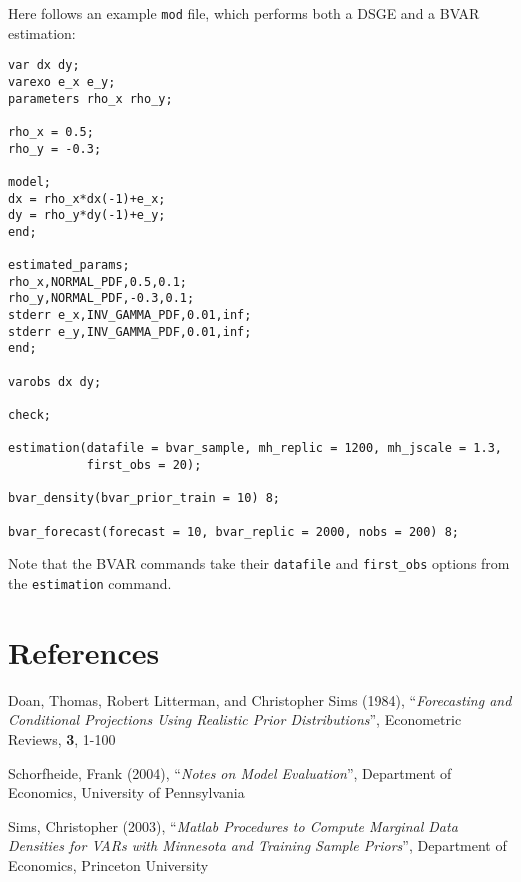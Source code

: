 \documentclass[11pt,a4paper]{article}
\begin{document}
Here follows an example \texttt{mod} file, which performs both a DSGE and a BVAR estimation:

\begin{verbatim}
var dx dy;
varexo e_x e_y;
parameters rho_x rho_y;

rho_x = 0.5;
rho_y = -0.3;

model;
dx = rho_x*dx(-1)+e_x;
dy = rho_y*dy(-1)+e_y;
end;

estimated_params;
rho_x,NORMAL_PDF,0.5,0.1;
rho_y,NORMAL_PDF,-0.3,0.1;
stderr e_x,INV_GAMMA_PDF,0.01,inf;
stderr e_y,INV_GAMMA_PDF,0.01,inf;
end;

varobs dx dy;

check;

estimation(datafile = bvar_sample, mh_replic = 1200, mh_jscale = 1.3,
           first_obs = 20);

bvar_density(bvar_prior_train = 10) 8;

bvar_forecast(forecast = 10, bvar_replic = 2000, nobs = 200) 8;
\end{verbatim}

Note that the BVAR commands take their \texttt{datafile} and \texttt{first\_obs} options from the \texttt{estimation} command.



\section*{References}

\noindent Doan, Thomas, Robert Litterman, and Christopher Sims (1984), ``\textit{Forecasting and Conditional Projections Using Realistic Prior Distributions}'', Econometric Reviews, \textbf{3}, 1-100

Schorfheide, Frank (2004), ``\textit{Notes on Model Evaluation}'', Department of Economics, University of Pennsylvania

Sims, Christopher (2003), ``\textit{Matlab Procedures to Compute Marginal Data Densities for VARs with Minnesota and Training Sample Priors}'', Department of Economics, Princeton University
\end{document}
